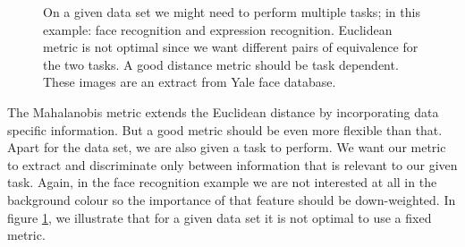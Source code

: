 	\begin{figure}
		 \centering
			    \hspace{0.07\textwidth}
		\caption[The need for a metric]{On a given data set we might need to perform multiple tasks; in this example: face recognition and expression recognition. Euclidean metric is not optimal since we want different pairs of equivalence for the two tasks. A good distance metric should be task dependent. These images are an extract from Yale face database.}
		\label{fig:face-recog-vs-expression-recog}
	\end{figure}

The Mahalanobis metric extends the Euclidean distance by incorporating data specific information. But a good metric should be even more flexible than that. Apart for the data set, we are also given a task to perform. We want our metric to extract and discriminate only between information that is relevant to our given task. Again, in the face
recognition example we are not interested at all in
the background colour so the importance of that feature
should be down-weighted. In figure \ref{fig:face-recog-vs-expression-recog}, we illustrate that for a given data set it is not optimal to use a fixed metric.

